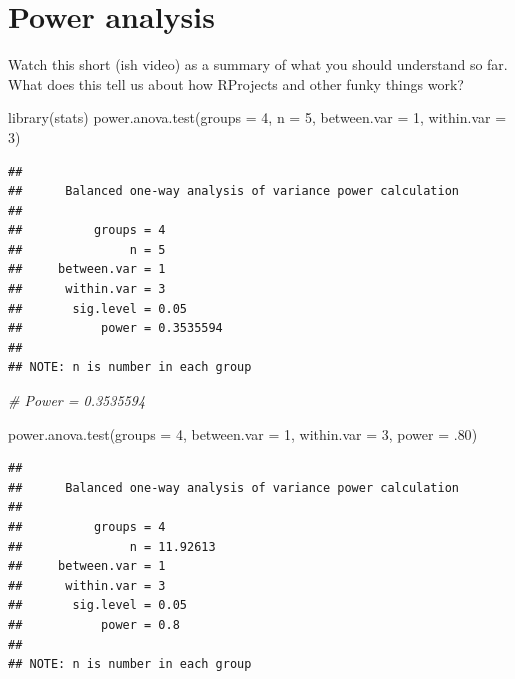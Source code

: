 \documentclass[
]{book}
\newenvironment{Shaded}{\begin{snugshade}}{\end{snugshade}}
\newcommand{\AttributeTok}[1]{\textcolor[rgb]{0.77,0.63,0.00}{#1}}
\newcommand{\CommentTok}[1]{\textcolor[rgb]{0.56,0.35,0.01}{\textit{#1}}}
\newcommand{\DecValTok}[1]{\textcolor[rgb]{0.00,0.00,0.81}{#1}}
\newcommand{\FunctionTok}[1]{\textcolor[rgb]{0.00,0.00,0.00}{#1}}
\newcommand{\NormalTok}[1]{#1}
\begin{document}
\hypertarget{power-analysis}{%
\chapter{Power analysis}\label{power-analysis}}

Watch this short (ish video) as a summary of what you should understand so far.
What does this tell us about how RProjects and other funky things work?

\begin{Shaded}
\begin{Highlighting}[]
\FunctionTok{library}\NormalTok{(stats)}
\FunctionTok{power.anova.test}\NormalTok{(}\AttributeTok{groups =} \DecValTok{4}\NormalTok{, }\AttributeTok{n =} \DecValTok{5}\NormalTok{, }\AttributeTok{between.var =} \DecValTok{1}\NormalTok{, }\AttributeTok{within.var =} \DecValTok{3}\NormalTok{)}
\end{Highlighting}
\end{Shaded}

\begin{verbatim}
## 
##      Balanced one-way analysis of variance power calculation 
## 
##          groups = 4
##               n = 5
##     between.var = 1
##      within.var = 3
##       sig.level = 0.05
##           power = 0.3535594
## 
## NOTE: n is number in each group
\end{verbatim}

\begin{Shaded}
\begin{Highlighting}[]
\CommentTok{\# Power = 0.3535594}

\FunctionTok{power.anova.test}\NormalTok{(}\AttributeTok{groups =} \DecValTok{4}\NormalTok{, }\AttributeTok{between.var =} \DecValTok{1}\NormalTok{, }\AttributeTok{within.var =} \DecValTok{3}\NormalTok{,}
                 \AttributeTok{power =}\NormalTok{ .}\DecValTok{80}\NormalTok{)}
\end{Highlighting}
\end{Shaded}

\begin{verbatim}
## 
##      Balanced one-way analysis of variance power calculation 
## 
##          groups = 4
##               n = 11.92613
##     between.var = 1
##      within.var = 3
##       sig.level = 0.05
##           power = 0.8
## 
## NOTE: n is number in each group
\end{verbatim}
\end{document}
